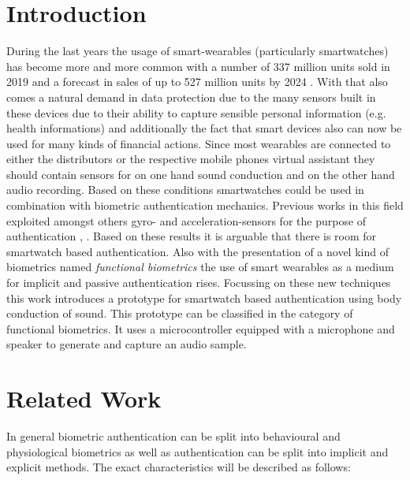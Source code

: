 \section{Introduction}
During the last years the usage of smart-wearables (particularly smartwatches) has become more and more common with a number of 337 million units sold in 2019 and a forecast in sales of up to 527 million units by 2024 \cite{tenzer}.
With that also comes a natural demand in data protection due to the many sensors built in these devices due to their ability to capture sensible personal information (e.g. health informations) and additionally the fact that smart devices also can now be used for many kinds of financial actions.
Since most wearables are connected to either the distributors or the respective mobile phones virtual assistant they should contain sensors for on one hand sound conduction and on the other hand audio recording.
Based on these conditions smartwatches could be used in combination with biometric authentication mechanics.
\newline
Previous works in this field exploited amongst others gyro- and acceleration-sensors for the purpose of authentication \cite{johnston2015smartwatch}, \cite{yang2015motionauth}.
Based on these results it is arguable that there is room for smartwatch based authentication. Also with the presentation of a novel kind of biometrics named \textit{functional biometrics} the use of smart wearables as a medium for implicit and passive authentication rises.
\newline
Focussing on these new techniques this work introduces a prototype for smartwatch based authentication using body conduction of sound. This prototype can be classified in the category of functional biometrics. It uses a microcontroller equipped with a microphone and speaker to generate and capture an audio sample.

\section{Related Work}
In general biometric authentication can be split into behavioural and physiological biometrics as well as authentication can be split into implicit and explicit methods.
The exact characteristics will be described as follows: 
